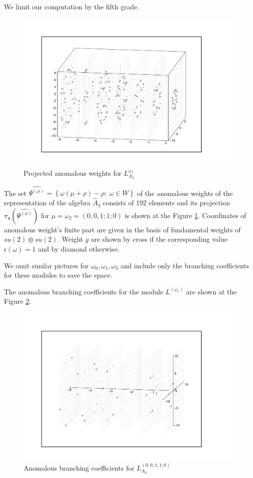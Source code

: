 \documentclass[a4paper,12pt]{article}
\theoremstyle{definition} \newtheorem{Def}{Definition}
\begin{document}
We limit our computation by the fifth grade.
\begin{figure}[h!tb]
  \includegraphics[width=170mm]{A1+A1-A3_anom.pdf}
  \caption{Projected anomalous weights for $L^{\omega_1}_{A_3}$}
  \label{fig:A1+A1-A3_anom}
\end{figure}

The set  $\widehat{\Psi^{(\mu)}}=\left\{\omega(\mu+\rho)-\rho;\; \omega\in W\right\}$ of the anomalous weights of the representation of the algebra $\hat{A}_3$ consists of 192 elements and its projection $\pi_{\mathfrak{a}}\left(\widehat{\Psi^{(\mu)}}\right)$ for $\mu=\omega_2=(0,0,1;1;0)$ is shown at the Figure \ref{fig:A1+A1-A3_anom}. Coordinates of anomalous weight's finite part are given in the basis of fundamental weights of $su(2)\oplus su(2)$. Weight $g$ are shown by cross if the corresponding value $\epsilon(\omega)=1$ and by diamond otherwise.

We omit similar pictures for $\omega_0, \omega_1,\omega_3$ and include only the branching coefficients for these modules to save the space.

The anomalous branching coefficients for the module $L^{(\omega_1)}$ are shown at the Figure  \ref{fig:A1+A1-A3_branching}.
\begin{figure}[h!tb]
  \includegraphics[width=180mm]{A1+A1-A3_branching.pdf}
  \caption{Anomalous branching coefficients for $L^{(0,0,1;1;0)}_{A_3}$}
  \label{fig:A1+A1-A3_branching}
\end{figure}
\end{document}
